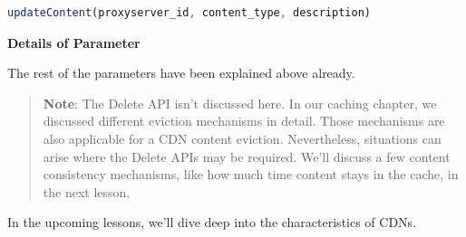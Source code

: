 \begin{lstlisting}[language=JavaScript]
updateContent(proxyserver_id, content_type, description)
\end{lstlisting}

\textbf{Details of Parameter}

\begin{table}[htbp]
\centering
\small
{}
\caption{Details of Parameter}
\end{table}

The rest of the parameters have been explained above already.
\begin{quote}
\textbf{Note}: The Delete API isn't discussed here. In our caching chapter, we discussed different eviction mechanisms in detail. Those mechanisms are also applicable for a CDN content eviction. Nevertheless, situations can arise where the Delete APIs may be required. We'll discuss a few content consistency mechanisms, like how much time content stays in the cache, in the next lesson.
\end{quote}

In the upcoming lessons, we'll dive deep into the characteristics of CDNs.

